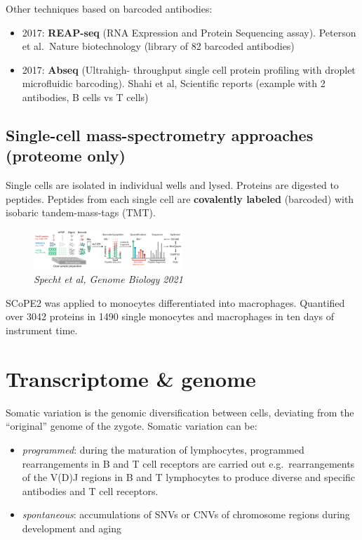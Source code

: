Other techniques based on barcoded antibodies:

\begin{itemize}
\tightlist
\item
  2017: \textbf{REAP-seq} (RNA Expression and Protein Sequencing assay).
  Peterson et al.~Nature biotechnology (library of 82 barcoded
  antibodies)
\item
  2017: \textbf{Abseq} (Ultrahigh- throughput single cell protein
  profiling with droplet microfluidic barcoding). Shahi et al,
  Scientific reports (example with 2 antibodies, B cells vs T cells)
\end{itemize}

\hypertarget{single-cell-mass-spectrometry-approaches-proteome-only}{%
\subsection{Single-cell mass-spectrometry approaches (proteome
only)}\label{single-cell-mass-spectrometry-approaches-proteome-only}}

Single cells are isolated in individual wells and lysed. Proteins
are digested to peptides. Peptides from each single cell are
\textbf{covalently labeled} (barcoded) with isobaric tandem-mass-tags
(TMT).

\begin{figure}
\centering
\includegraphics[width=0.5\textwidth]{images/Screenshot_1.png}
\caption{\emph{Specht et al, Genome Biology 2021}}
\end{figure}


SCoPE2 was applied to monocytes differentiated into macrophages.
Quantified over 3042 proteins in 1490 single monocytes and macrophages
in ten days of instrument time.

\hypertarget{transcriptome-genome}{%
\section{Transcriptome \& genome}\label{transcriptome-genome}}

Somatic variation is the genomic diversification between cells,
deviating from the ``original'' genome of the zygote. Somatic variation
can be:

\begin{itemize}
\tightlist
\item
  \emph{programmed}: during the maturation of lymphocytes, programmed
  rearrangements in B and T cell receptors are carried out
  e.g.~rearrangements of the V(D)J regions in B and T lymphocytes to
  produce diverse and specific antibodies and T cell receptors.
\item
  \emph{spontaneous}: accumulations of SNVs or CNVs of chromosome
  regions during development and aging
\end{itemize}

